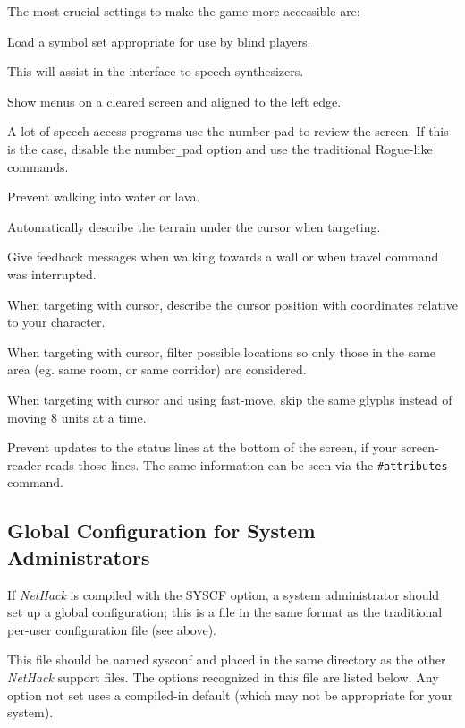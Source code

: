 The most crucial settings to make the game more accessible are:
\blist{}
\item[\ib{symset:plain}]
Load a symbol set appropriate for use by blind players.
\item[\ib{menustyle:traditional}]
This will assist in the interface to speech synthesizers.
\item[\ib{nomenu\verb+_+overlay}]
Show menus on a cleared screen and aligned to the left edge.
\item[\ib{number\verb+_+pad}]
A lot of speech access programs use the number-pad to review the screen.
If this is the case, disable the number\verb+_+pad option and use the
traditional Rogue-like commands.
\item[\ib{paranoid\verb+_+confirmation:swim}]
Prevent walking into water or lava.
\item[\ib{autodescribe}]
Automatically describe the terrain under the cursor when targeting.
\item[\ib{mention\verb+_+walls}]
Give feedback messages when walking towards a wall or when travel command
was interrupted.
\item[\ib{whatis\verb+_+coord:compass}]
When targeting with cursor, describe the cursor position with coordinates
relative to your character.
\item[\ib{whatis\verb+_+filter:area}]
When targeting with cursor, filter possible locations so only those in
the same area (eg. same room, or same corridor) are considered.
\item[\ib{whatis\verb+_+moveskip}]
When targeting with cursor and using fast-move, skip the same glyphs instead
of moving 8 units at a time.
\item[\ib{nostatus\verb+_+updates}]
Prevent updates to the status lines at the bottom of the screen, if
your screen-reader reads those lines. The same information can be
seen via the {\tt \#attributes} command.
\elist

\subsection*{Global Configuration for System Administrators}

If {\it NetHack\/} is compiled with the SYSCF option, a system administrator
should set up a global configuration; this is a file in the
same format as the traditional per-user configuration file (see above).

This file should be named sysconf and placed in the same directory as
the other {\it NetHack\/} support files.
The options recognized in this file are listed below. Any option not
set uses a compiled-in default (which may not be appropriate for your
system).

